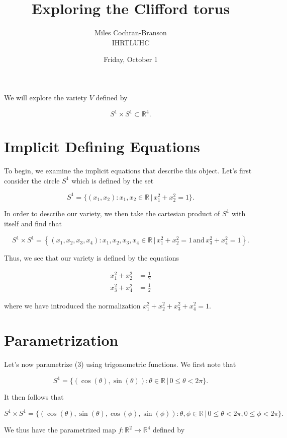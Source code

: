 \documentclass{article}
\title{Exploring the Clifford torus}
\author{Miles Cochran-Branson \\ \small{IHRTLUHC}}
\date{Friday, October 1}
\newcommand{\be}{\begin{equation}}
\newcommand{\ee}{\end{equation}}
\newcommand{\real}{\mathbb{R}}
\begin{document}
\maketitle

We will explore the variety $V$ defined by 

\be
	S^1 \times S^1 \subset \real^4. 
\ee

\section*{Implicit Defining Equations}

To begin, we examine the implicit equations that describe this object. Let's first consider the circle $S^1$ which is defined by the set 

\be
	S^1 = \{ (x_1, x_2) : x_1, x_2 \in \real \, | \, x_1^2 + x_2^2 = 1\}. 
\ee

In order to describe our variety, we then take the cartesian product of $S^1$ with itself and find that

\[
	S^1 \times S^1 = \left\{(x_1, x_2, x_3, x_4) : x_1, x_2, x_3, x_4 \in \real \, | \, x_1^2 + x_2^2 = 1 \, \textrm{and} \, x_3^2 + x_4^2 = 1\right\}. 
\]

Thus, we see that our variety is defined by the equations

\be
\begin{split}
	x_1^2 + x_2^2 & = \frac{1}{2} \\
	x_3^2 + x_4^2 & = \frac{1}{2}
\label{eqn:implicit}
\end{split}
\ee

where we have introduced the normalization $x_1^2 + x_2^2 + x_3^2 + x_4^2 = 1$. 

\section*{Parametrization}

Let's now parametrize (3) using trigonometric functions. We first note that 

\be
	S^1 = \{(\cos(\theta), \sin(\theta)) : \theta \in \real \, | \, 0 \le \theta < 2\pi \}. 
\ee

It then follows that

\[
	S^1 \times S^1 = \{(\cos(\theta), \sin(\theta), \cos(\phi), \sin(\phi)) : \theta, \phi \in \real \, | \, 0 \le \theta < 2\pi, 0 \le \phi < 2\pi \}. 
\]

We thus have the parametrized map $f: \real^2 \rightarrow \real^4$ defined by
\end{document}
